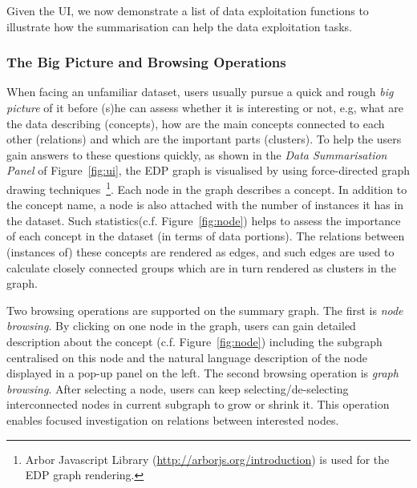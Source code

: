 Given the UI, we now demonstrate a list of data exploitation functions to illustrate how the summarisation can help the data exploitation tasks.

\vspace{-4ex}
\subsubsection{The Big Picture and Browsing Operations}
When facing an unfamiliar dataset, users usually pursue a quick and rough \emph{big picture} of it before (s)he can assess whether it is interesting or not, e.g, what are the data describing (concepts), how are the main concepts connected to each other (relations) and which are the important parts (clusters). To help the users gain answers to these questions quickly, as shown in the \emph{Data Summarisation Panel} of Figure~\ref{fig:ui}, the EDP graph is visualised by using force-directed graph drawing techniques~\footnote{Arbor Javascript Library (\url{http://arborjs.org/introduction}) is used for the EDP graph rendering.}. Each node in the graph describes a concept. In addition to the concept name, a node is also attached with the number of instances it has in the dataset. Such statistics(c.f. Figure~\ref{fig:node}) helps to assess the importance of each concept in the dataset (in terms of data portions). The relations between (instances of) these concepts are rendered as edges, and such edges are used to calculate closely connected groups which are in turn rendered as clusters in the graph.

Two browsing operations are supported on the summary graph. The first is \emph{node browsing}. By clicking on one node in the graph, users can gain detailed description about the concept (c.f. Figure~\ref{fig:node}) including the subgraph centralised on this node and the natural language description of the node displayed in a pop-up panel on the left. The second browsing operation is \emph{graph browsing}. After selecting a node, users can keep selecting/de-selecting interconnected nodes in current subgraph to grow or shrink it. This operation enables focused investigation on relations between interested nodes.

\vspace{-3ex}

